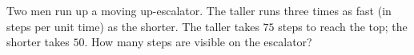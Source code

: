 Two men run up a moving up-escalator. The taller runs three times as fast (in steps per unit time) as the shorter. The taller takes $75$ steps to reach the top; the shorter takes $50$. How many steps are visible on the escalator?
